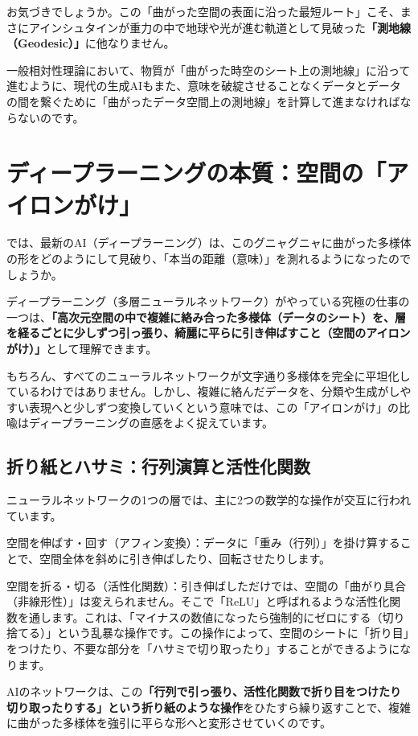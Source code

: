 お気づきでしょうか。この「曲がった空間の表面に沿った最短ルート」こそ、まさにアインシュタインが重力の中で地球や光が進む軌道として見破った\textbf{「測地線（Geodesic）」}に他なりません。

一般相対性理論において、物質が「曲がった時空のシート上の測地線」に沿って進むように、現代の生成AIもまた、意味を破綻させることなくデータとデータの間を繋ぐために「曲がったデータ空間上の測地線」を計算して進まなければならないのです。

\section{ディープラーニングの本質：空間の「アイロンがけ」}

では、最新のAI（ディープラーニング）は、このグニャグニャに曲がった多様体の形をどのようにして見破り、「本当の距離（意味）」を測れるようになったのでしょうか。

ディープラーニング（多層ニューラルネットワーク）がやっている究極の仕事の一つは、\textbf{「高次元空間の中で複雑に絡み合った多様体（データのシート）を、層を経るごとに少しずつ引っ張り、綺麗に平らに引き伸ばすこと（空間のアイロンがけ）」}として理解できます。

もちろん、すべてのニューラルネットワークが文字通り多様体を完全に平坦化しているわけではありません。しかし、複雑に絡んだデータを、分類や生成がしやすい表現へと少しずつ変換していくという意味では、この「アイロンがけ」の比喩はディープラーニングの直感をよく捉えています。

\subsection{折り紙とハサミ：行列演算と活性化関数}

ニューラルネットワークの1つの層では、主に2つの数学的な操作が交互に行われています。

空間を伸ばす・回す（アフィン変換）：データに「重み（行列）」を掛け算することで、空間全体を斜めに引き伸ばしたり、回転させたりします。

空間を折る・切る（活性化関数）：引き伸ばしただけでは、空間の「曲がり具合（非線形性）」は変えられません。そこで「ReLU」と呼ばれるような活性化関数を通します。これは、「マイナスの数値になったら強制的にゼロにする（切り捨てる）」という乱暴な操作です。この操作によって、空間のシートに「折り目」をつけたり、不要な部分を「ハサミで切り取ったり」することができるようになります。

AIのネットワークは、この\textbf{「行列で引っ張り、活性化関数で折り目をつけたり切り取ったりする」という折り紙のような操作}をひたすら繰り返すことで、複雑に曲がった多様体を強引に平らな形へと変形させていくのです。

